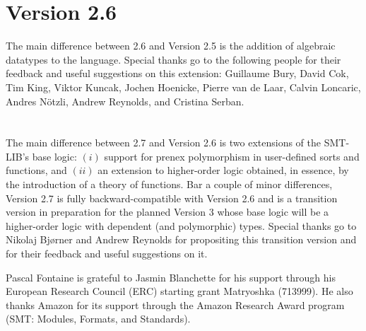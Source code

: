\section*{Version 2.6}

The main difference between 2.6 and Version 2.5 is the addition of algebraic datatypes to the language.
Special thanks go to the following people
for their feedback and useful suggestions on this extension:
Guillaume Bury,
David Cok,
Tim King,
Viktor Kuncak,
Jochen Hoenicke,
Pierre van de Laar,
Calvin Loncaric,
Andres N{\"o}tzli,
Andrew Reynolds,
and
Cristina Serban.

\section*{\thisversion}

\begin{newver}
The main difference between 2.7 and Version 2.6 is two extensions of 
the SMT-LIB's base logic:
$(i)$ support for prenex polymorphism in user-defined sorts and functions, and
$(ii)$ an extension to higher-order logic obtained, 
in essence, by the introduction of a theory of functions.
Bar a couple of minor differences,
Version 2.7 is fully backward-compatible with Version 2.6
and is a transition version in preparation for the planned Version 3
whose base logic will be a higher-order logic with dependent (and polymorphic)
types.
Special thanks go to 
Nikolaj Bj{\o}rner and
Andrew Reynolds for propositing this transition version and 
for their feedback and useful suggestions on it.

Pascal Fontaine is grateful to Jasmin Blanchette for his support through his European Research Council (ERC) starting grant Matryoshka (713999).  
He also thanks Amazon for its support through the Amazon Research Award program 
(SMT: Modules, Formats, and Standards).
\end{newver}
